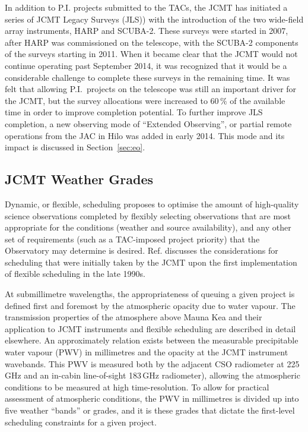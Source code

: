 \documentclass[]{spie}  %
\begin{document}
In addition to P.I. projects submitted to the TACs, the JCMT has
initiated a series of JCMT Legacy Surveys (JLS))\cite{2005prpl.conf.8370M,2007PASP..119..102P,2007PASP..119..842M,2007PASP..119..855W,2007arXiv0704.3202T,2009ApJ...693.1736W,2013MNRAS.432...53G} with the introduction
of the two wide-field array instruments, HARP and SCUBA-2. These
surveys were started in 2007, after HARP was commissioned on the
telescope, with the SCUBA-2 components of the surveys starting in
2011. When it became clear that the JCMT would not continue operating
past September 2014, it was recognized that it would be a considerable
challenge to complete these surveys in the remaining time. It was felt
that allowing P.I.\ projects on the telescope was still an important
driver for the JCMT, but the survey allocations were increased to
60\,$\%$ of the available time in order to improve completion
potential. To further improve JLS completion, a new observing mode of
``Extended Observing'', or partial remote operations from the JAC in
Hilo was added in early 2014. This mode and its impact is discussed in
Section~\ref{sec:eo}.

\subsection{JCMT Weather Grades}

Dynamic, or flexible, scheduling proposes to optimise the amount of
high-quality science observations completed by flexibly selecting
observations that are most appropriate for the conditions (weather and
source availability), and any other set of requirements (such as a
TAC-imposed project priority) that the Observatory may determine is
desired. Ref.  discusses the considerations for
scheduling that were initially taken by the JCMT upon the first
implementation of flexible scheduling in the late 1990s.

At submillimetre wavelengths, the appropriateness of queuing a given
project is defined first and foremost by the atmospheric opacity due
to water vapour. The transmission properties of the atmosphere above
Mauna Kea and their application to JCMT instruments and flexible
scheduling are described in detail elsewhere\cite{robson2002}. An
approximately relation exists between the measurable precipitable
water vapour (PWV) in millimetres and the opacity at the JCMT
instrument wavebands.\cite{2013MNRAS.430.2534D,archibald} This PWV is
measured both by the adjacent CSO radiometer at 225\,GHz and an
in-cabin line-of-sight 183\,GHz
radiometer\cite{wiedner,2008SPIE.7012E.137D}), allowing the
atmospheric conditions to be measured at high time-resolution. To
allow for practical assessment of atmospheric conditions, the PWV in
millimetres is divided up into five weather ``bands'' or grades, and
it is these grades that dictate the first-level scheduling constraints
for a given project.
\end{document}

